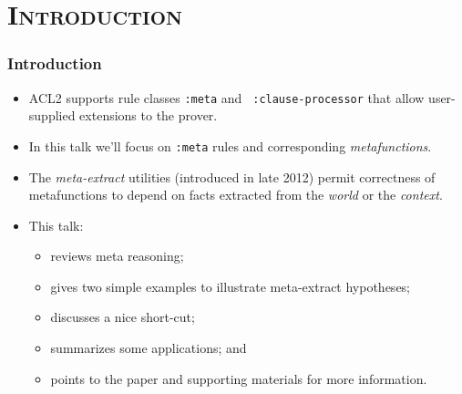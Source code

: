 \section{\scshape Introduction}
\begin{frame}[fragile]
\frametitle{Introduction}

\begin{itemize}

\item ACL2 supports rule classes {\tt :meta} and {\tt
    :clause-processor} that allow user-supplied extensions to the
  prover.

\item In this talk we'll focus on {\tt :meta} rules and corresponding
  {\em metafunctions}.

\item The {\em meta-extract} utilities (introduced in late 2012)
  permit correctness of metafunctions to depend on facts extracted
  from the {\em world} or the {\em context}.

\item This talk:

  \begin{itemize}

  \item reviews meta reasoning;

  \item gives two simple examples to illustrate meta-extract hypotheses;

  \item discusses a nice short-cut;

  \item summarizes some applications; and

  \item points to the paper and supporting materials for more information.

  \end{itemize}

\end{itemize}

\end{frame}

